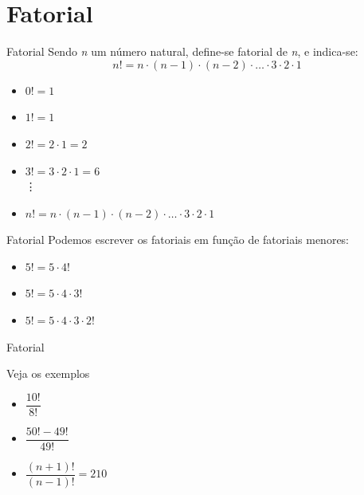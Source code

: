 \documentclass[aspectratio=169,xcolor=dvipsnames]{beamer}
\begin{document}
\section{Fatorial}

\begin{frame}{Fatorial}
    Sendo \textit{n} um número natural, define-se fatorial de \textit{n}, e indica-se:
    \begin{equation*}
        n! = n \cdot (n -1) \cdot (n-2) \cdot \dots \cdot 3 \cdot 2 \cdot 1
    \end{equation*}

    \begin{itemize}
        \item $0! = 1$
        \item $1! = 1$
        \item $2! = 2 \cdot 1 = 2$
        \item $3! = 3 \cdot 2 \cdot 1 = 6$ \\ \hspace{1cm} \vdots
        \item $n! = n \cdot (n -1) \cdot (n - 2) \cdot \dots \cdot 3 \cdot 2 \cdot 1$
    \end{itemize}

\end{frame}


\begin{frame}{Fatorial}
    Podemos escrever os fatoriais em função de fatoriais menores:

    \begin{itemize}
        \item $5! = 5 \cdot 4!$
        \item $5! = 5 \cdot 4 \cdot 3!$
        \item $5! = 5 \cdot 4 \cdot 3 \cdot  2!$
    \end{itemize}
\end{frame}


\begin{frame}{Fatorial}
    \begin{center}
        Veja os exemplos
    \end{center}

    \begin{itemize}
        \item $\dfrac{10!}{8!}$
        \item $\dfrac{50! - 49!}{49!}$
        \item $\dfrac{(n+1)!}{(n-1)!} = 210$
    \end{itemize}

\end{frame}
\end{document}
